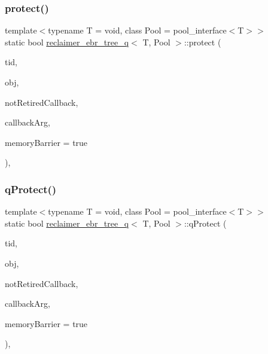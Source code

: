 \mbox{\label{classreclaimer__ebr__tree__q_ae26adcb58782a2f7b16b1751389b4668}} 
\subsubsection{\texorpdfstring{protect()}{protect()}}
{\footnotesize\ttfamily template$<$typename T  = void, class Pool  = pool\+\_\+interface$<$\+T$>$$>$ \\
static bool \hyperlink{classreclaimer__ebr__tree__q}{reclaimer\+\_\+ebr\+\_\+tree\+\_\+q}$<$ T, Pool $>$\+::protect (\begin{DoxyParamCaption}\item[{const int}]{tid,  }\item[{T $\ast$const}]{obj,  }\item[{\hyperlink{globals_8h_a57f5c0d40b156d7d996492fb2f16e3cd}{Callback\+Type}}]{not\+Retired\+Callback,  }\item[{\hyperlink{globals_8h_a3de64ef48066ac6430631c8b81a15345}{Callback\+Arg}}]{callback\+Arg,  }\item[{bool}]{memory\+Barrier = {\ttfamily true} }\end{DoxyParamCaption})\hspace{0.3cm}{\ttfamily [inline]}, {\ttfamily [static]}}

\mbox{\label{classreclaimer__ebr__tree__q_aea39367ff1e781d1841c9da13a7fe9c3}} 
\subsubsection{\texorpdfstring{q\+Protect()}{qProtect()}}
{\footnotesize\ttfamily template$<$typename T  = void, class Pool  = pool\+\_\+interface$<$\+T$>$$>$ \\
static bool \hyperlink{classreclaimer__ebr__tree__q}{reclaimer\+\_\+ebr\+\_\+tree\+\_\+q}$<$ T, Pool $>$\+::q\+Protect (\begin{DoxyParamCaption}\item[{const int}]{tid,  }\item[{T $\ast$const}]{obj,  }\item[{\hyperlink{globals_8h_a57f5c0d40b156d7d996492fb2f16e3cd}{Callback\+Type}}]{not\+Retired\+Callback,  }\item[{\hyperlink{globals_8h_a3de64ef48066ac6430631c8b81a15345}{Callback\+Arg}}]{callback\+Arg,  }\item[{bool}]{memory\+Barrier = {\ttfamily true} }\end{DoxyParamCaption})\hspace{0.3cm}{\ttfamily [inline]}, {\ttfamily [static]}}

